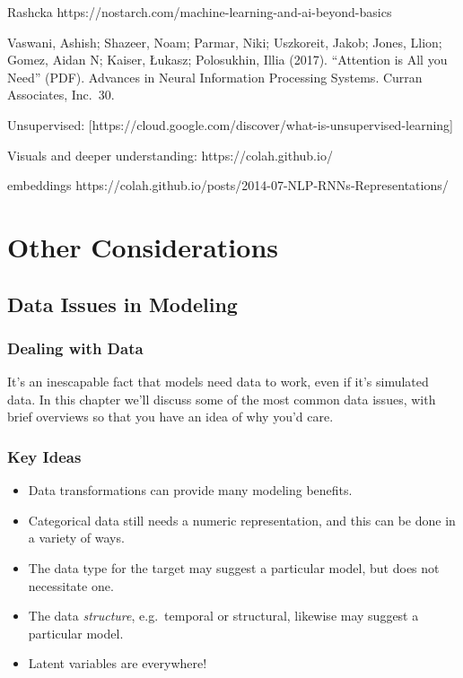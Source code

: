 \documentclass[
  letterpaper,
]{krantz}
\providecommand{\tightlist}{%
  \setlength{\itemsep}{0pt}\setlength{\parskip}{0pt}}\usepackage{longtable,booktabs,array}
\begin{document}
Rashcka https://nostarch.com/machine-learning-and-ai-beyond-basics

Vaswani, Ashish; Shazeer, Noam; Parmar, Niki; Uszkoreit, Jakob; Jones,
Llion; Gomez, Aidan N; Kaiser, Łukasz; Polosukhin, Illia (2017).
``Attention is All you Need'' (PDF). Advances in Neural Information
Processing Systems. Curran Associates, Inc.~30.

Unsupervised:
{[}https://cloud.google.com/discover/what-is-unsupervised-learning{]}

Visuals and deeper understanding: https://colah.github.io/

embeddings
https://colah.github.io/posts/2014-07-NLP-RNNs-Representations/

\part{Other Considerations}

\chapter{Data Issues in Modeling}\label{data-issues-in-modeling}

\section{Dealing with Data}\label{dealing-with-data}

It's an inescapable fact that models need data to work, even if it's
simulated data. In this chapter we'll discuss some of the most common
data issues, with brief overviews so that you have an idea of why you'd
care.

\section{Key Ideas}\label{key-ideas-6}

\begin{itemize}
\tightlist
\item
  Data transformations can provide many modeling benefits.
\item
  Categorical data still needs a numeric representation, and this can be
  done in a variety of ways.
\item
  The data type for the target may suggest a particular model, but does
  not necessitate one.
\item
  The data \emph{structure}, e.g.~temporal or structural, likewise may
  suggest a particular model.
\item
  Latent variables are everywhere!
\end{itemize}
\end{document}
